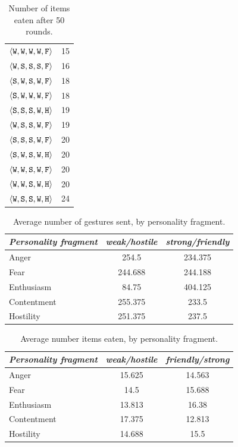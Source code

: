 \begin{table}
{{\begin{minipage}[b]{0.42\hsize}
\begin{tabular}{ l | c }
						$\langle \mathtt{W},\mathtt{W}, \mathtt{W}, \mathtt{W}, \mathtt{F} \rangle$ & 15\\
						$\langle \mathtt{W},\mathtt{S}, \mathtt{S}, \mathtt{S}, \mathtt{F} \rangle$ & 16\\
						$\langle \mathtt{S},\mathtt{W}, \mathtt{S}, \mathtt{W}, \mathtt{F} \rangle$ & 18\\
						$\langle \mathtt{S},\mathtt{W}, \mathtt{W}, \mathtt{W}, \mathtt{F} \rangle$ & 18\\
						$\langle \mathtt{S},\mathtt{S}, \mathtt{S}, \mathtt{W}, \mathtt{H} \rangle$ & 19\\
						$\langle \mathtt{W},\mathtt{S}, \mathtt{S}, \mathtt{W}, \mathtt{F} \rangle$ & 19\\
						$\langle \mathtt{S},\mathtt{S}, \mathtt{S}, \mathtt{W}, \mathtt{F} \rangle$ & 20\\
						$\langle \mathtt{S},\mathtt{W}, \mathtt{S}, \mathtt{W}, \mathtt{H} \rangle$ & 20\\
						$\langle \mathtt{W},\mathtt{W}, \mathtt{S}, \mathtt{W}, \mathtt{F} \rangle$ & 20\\
						$\langle \mathtt{W},\mathtt{W}, \mathtt{S}, \mathtt{W}, \mathtt{H} \rangle$ & 20\\
						$\langle \mathtt{W},\mathtt{S}, \mathtt{S}, \mathtt{W}, \mathtt{H} \rangle$ & 24\\
						\hline
				\end{tabular}
				\caption{Number of items eaten after 50 rounds.}
				\label{tab:numMeals}
			\end{minipage}
			\hfill
		}}
\end{table}

\begin{table}
	\centering
	\begin{tabular}{ l | c | c }
		\emph{Personality fragment} & \emph{weak/hostile} & \emph{ strong/friendly} \\
		\hline
			Anger & 254.5 & 234.375\\
			Fear & 244.688 & 244.188\\
			Enthusiasm & 84.75 & 404.125\\
			Contentment & 255.375 & 233.5\\
			Hostility & 251.375 & 237.5\\
		\hline
	\end{tabular}
	\caption{Average number of gestures sent, by personality fragment.}
	\label{tab:numGesturesAvg}
\end{table}

\begin{table}
	\centering
	\begin{tabular}{ l | c | c }
		\emph{Personality fragment} & \emph{weak/hostile} & \emph{friendly/strong} \\
		\hline
			Anger & 15.625 & 14.563\\
			Fear & 14.5 & 15.688\\
			Enthusiasm & 13.813 & 16.38\\
			Contentment & 17.375 & 12.813\\
			Hostility & 14.688 & 15.5\\
		\hline
	\end{tabular}
	\caption{Average number items eaten, by personality fragment.}
	\label{tab:numMealsAvg}
\end{table}

